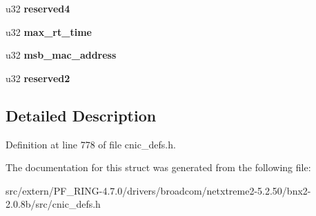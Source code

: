 \begin{DoxyCompactItemize}
\item 
\hypertarget{structtstorm__tcp__st__context__section_a5c6613f2fa156842e6d083855d7b0b29}{
u32 {\bfseries reserved4}}
\label{structtstorm__tcp__st__context__section_a5c6613f2fa156842e6d083855d7b0b29}

\item 
\hypertarget{structtstorm__tcp__st__context__section_a2b31c8354fcc202798a4e42fe7f50cfc}{
u32 {\bfseries max\_\-rt\_\-time}}
\label{structtstorm__tcp__st__context__section_a2b31c8354fcc202798a4e42fe7f50cfc}

\item 
\hypertarget{structtstorm__tcp__st__context__section_a5748f95a2e1e2a27fa96bb3dc1d7bbcb}{
u32 {\bfseries msb\_\-mac\_\-address}}
\label{structtstorm__tcp__st__context__section_a5748f95a2e1e2a27fa96bb3dc1d7bbcb}

\item 
\hypertarget{structtstorm__tcp__st__context__section_a97abbf221c95862547b836e07596981e}{
u32 {\bfseries reserved2}}
\label{structtstorm__tcp__st__context__section_a97abbf221c95862547b836e07596981e}

\end{DoxyCompactItemize}


\subsection{Detailed Description}


Definition at line 778 of file cnic\_\-defs.h.



The documentation for this struct was generated from the following file:\begin{DoxyCompactItemize}
\item 
src/extern/PF\_\-RING-\/4.7.0/drivers/broadcom/netxtreme2-\/5.2.50/bnx2-\/2.0.8b/src/cnic\_\-defs.h\end{DoxyCompactItemize}
